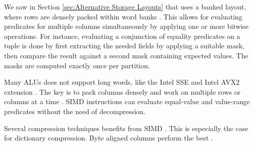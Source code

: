 We saw in Section \ref{sec:Alternative Storage Layouts} that \blink uses a banked layout, where rows are densely packed within word banks \cite{Raman2008-gi}. This allows for evaluating predicates for multiple columns simultaneously by applying one or more bitwise operations. For instance, evaluating a conjunction of equality predicates on a tuple is done by first extracting the needed fields by applying a suitable mask, then compare the result against a second mask containing expected values. The masks are computed exactly once per partition.

Many ALUs does not support long words, like the Intel SSE and Intel AVX2 extension \cite{Willhalm2009-hu, Willhalm2013-rl}. The key is to pack columns densely and work on multiple rows or columns at a time \cite{Johnson2008-cp}. SIMD instructions can evaluate equal-value and value-range predicates without the need of decompression.

Several compression techniques benefits from SIMD \cite{Lemke2010-is}. This is especially the case for dictionary compression. Byte aligned columns perform the best \cite{Willhalm2009-hu}.

